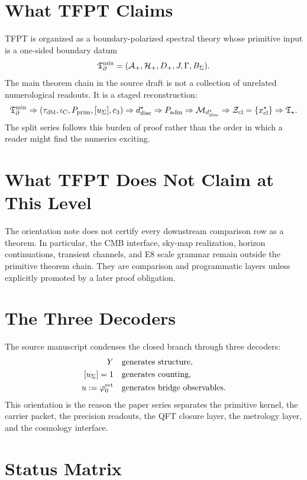 \documentclass[11pt,a4paper]{article}
\begin{document}
\tableofcontents

\section{What TFPT Claims}

TFPT is organized as a boundary-polarized spectral theory whose primitive input is a one-sided
boundary datum
\[
\mathfrak T_{\partial}^{\min}=(\mathcal A_+,\mathcal H_+,D_+,J,\Gamma,B_\Sigma).
\]
The main theorem chain in the source draft is not a collection of unrelated numerological
readouts. It is a staged reconstruction:
\[
\mathfrak T_{\partial}^{\min}
\Rightarrow
(\tau_{\mathrm{dbl}},\iota_{\mathrm C},P_{\mathrm{prim}},[u_\Sigma],c_3)
\Rightarrow
d^\star_{\mathrm{disc}}
\Rightarrow
P_{\mathrm{adm}}
\Rightarrow
\mathcal M_{d^\star_{\mathrm{disc}}}
\Rightarrow
\mathcal Z_{\mathrm{cl}}=\{x^\star_{\mathrm{cl}}\}
\Rightarrow
\mathfrak T_{\star} .
\]
The split series follows this burden of proof rather than the order in which a reader might find
the numerics exciting.

\section{What TFPT Does Not Claim at This Level}

The orientation note does not certify every downstream comparison row as a theorem. In particular,
the CMB interface, sky-map realization, horizon continuations, transient channels, and E8 scale
grammar remain outside the primitive theorem chain. They are comparison and programmatic layers
unless explicitly promoted by a later proof obligation.

\section{The Three Decoders}

The source manuscript condenses the closed branch through three decoders:
\[
\begin{aligned}
Y&\quad\text{generates structure},\\
[u_\Sigma]=1&\quad\text{generates counting},\\
u:=\varphi_0^{\mathrm{ret}}&\quad\text{generates bridge observables}.
\end{aligned}
\]
This orientation is the reason the paper series separates the primitive kernel, the carrier
packet, the precision readouts, the QFT closure layer, the metrology layer, and the cosmology
interface.

\section{Status Matrix}
\end{document}
